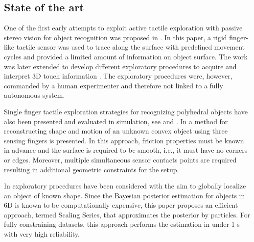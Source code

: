 \subsection{State of the art}
\label{sec:SoA}

One of the first early attempts to exploit active tactile exploration with passive stereo vision for object recognition was proposed in \citet{Allen1987Robotic}. In this paper, a rigid finger-like tactile sensor was used to trace along the surface with predefined movement cycles and provided a limited amount of information on object surface. The work was later extended to develop different exploratory procedures to acquire and interpret 3D touch information \citet{Allen1990Acquisition}. The exploratory procedures were, however, commanded by a human experimenter and therefore not linked to a fully autonomous system.
 
Single finger tactile exploration strategies for recognizing polyhedral objects have also been presented and evaluated in simulation, see \citet{Roberts1990ICRA} and \citet{Caselli1996ICRA}. In \citet{Moll2003STAR} a method for reconstructing shape and motion of an unknown convex object using three sensing fingers is presented. In this approach, friction properties must be known in advance and the surface is required to be smooth, i.e., it must have no corners or edges. Moreover, multiple simultaneous sensor contacts points are required resulting in additional geometric constraints for the setup.
 

In \citet{Petrovskaya2011Global} exploratory procedures have been considered with the aim to globally localize an object of known shape. Since the Bayesian posterior estimation for objects in 6D is known to be computationally expensive, this paper proposes an efficient approach, termed Scaling Series, that approximates the posterior by particles. For fully constraining datasets, this approach performs the estimation in under 1 s with very high reliability.

